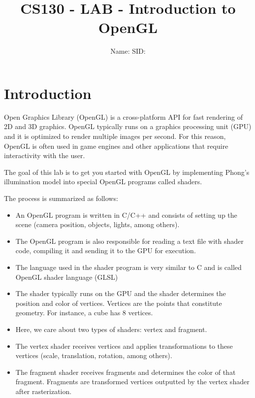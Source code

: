 \documentclass[12pt]{article}
\newcommand{\TODOL}[1]{\textcolor{red}{\underline{\hspace{#1 cm}}}}
\begin{document}
\title{CS130 - LAB - Introduction to OpenGL}
\date{}
\author{Name: \TODOL7\qquad\qquad SID: \TODOL4}
\maketitle
\begin{center}
\end{center}

\section*{Introduction}

Open Graphics Library (OpenGL) is a cross-platform API for fast rendering of 2D
and 3D graphics. OpenGL typically runs on a graphics processing unit (GPU) and
it is optimized to render multiple images per second. For this reason, OpenGL is
often used in game engines and other applications that require interactivity
with the user.

The goal of this lab is to get you started with OpenGL by implementing Phong's
illumination model into special OpenGL programs called shaders.

The process is summarized as follows:

\begin{itemize}
\item An OpenGL program is written in C/C++ and consists of setting up the scene
  (camera position, objects, lights, among others).
\item The OpenGL program is also responsible for reading a text file with shader
  code, compiling it and sending it to the GPU for execution.
\item The language used in the shader program is very similar to C and is called
  OpenGL shader language (GLSL)
\item The shader typically runs on the GPU and the shader determines the
  position and color of vertices. Vertices are the points that constitute
  geometry. For instance, a cube has 8 vertices.
\item Here, we care about two types of shaders: vertex and fragment.
\item The vertex shader receives vertices and applies transformations to these
  vertices (scale, translation, rotation, among others).
\item The fragment shader receives fragments and determines the color of that
  fragment. Fragments are transformed vertices outputted by the vertex shader
  after rasterization.
\end{itemize}
\end{document}
